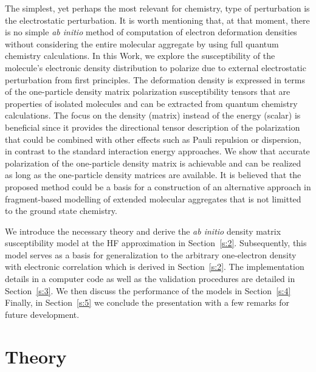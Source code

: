 \documentclass[aip,amsmath,amssymb,reprint,floatfix]{revtex4-1}
\begin{document}
The simplest, yet perhaps the most relevant for chemistry, type of perturbation 
is the electrostatic perturbation.
It is worth mentioning that, at that moment, there is no simple \emph{ab initio}
method of computation of electron deformation densities without considering the entire molecular 
aggregate by using full quantum chemistry calculations.\cite{Horn.Yuezhi.Head-Gordon.JCP.2016,Horn.Head-Gordon.JCP.2015}
In this Work, we explore the susceptibility of the molecule's electronic density distribution
to polarize due to external electrostatic perturbation from first principles. 
The deformation density is expressed in terms
of the one\hyp{}particle density matrix polarization susceptibility tensors 
that are properties of isolated molecules and can be
extracted from quantum chemistry calculations. The focus on the density (matrix) instead of the energy
(scalar) is beneficial since it provides the directional tensor description
of the polarization that could be combined with other effects such as Pauli repulsion 
or dispersion,\cite{Mandado.Hermida-Ramon.JCTC.2011}
in contrast to the standard interaction energy approaches. We show that accurate polarization 
of the one\hyp{}particle density
matrix is achievable and can be realized as long as the one\hyp{}particle density matrices
are available. It is believed that the proposed method
could be a basis for a construction of an 
alternative approach in fragment\hyp{}based
modelling of extended molecular aggregates that is not limitted to the ground state chemistry.

We introduce the necessary theory and derive the \emph{ab initio} density matrix susceptibility model
at the HF approximation\cite{Roothaan.RevModPhys.1951} 
in Section~\ref{s:2}. Subsequently, this model serves as a basis for generalization to the 
arbitrary one\hyp{}electron density with electronic correlation which is derived in Section~\ref{s:2}. 
The implementation details in a computer code as well as the validation procedures are detailed
in Section~\ref{s:3}. We then discuss the performance of the models in Section~\ref{s:4} 
Finally, in Section~\ref{s:5} we conclude the presentation with a few 
remarks for future development.

%

\section{\label{s:2}Theory}
\end{document}
